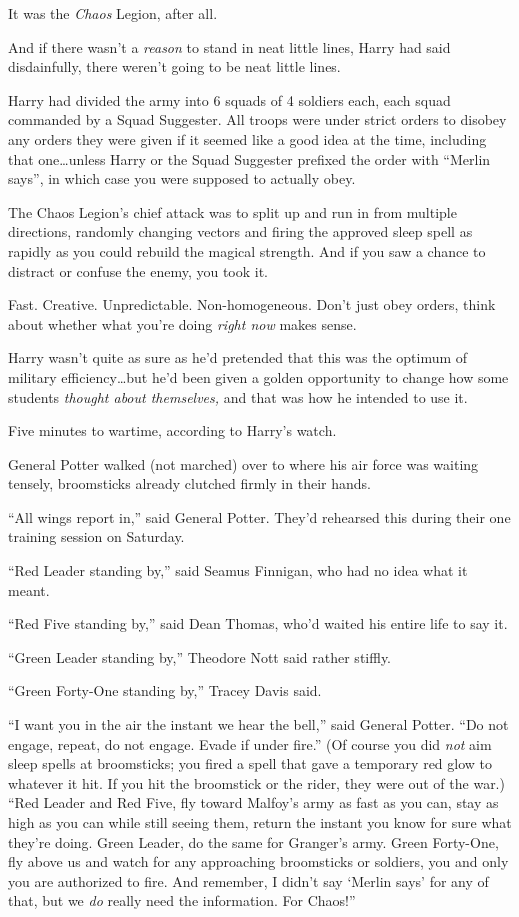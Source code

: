 It was the \emph{Chaos} Legion, after all.

And if there wasn’t a \emph{reason} to stand in neat little lines, Harry had said disdainfully, there weren’t going to be neat little lines.

Harry had divided the army into 6 squads of 4 soldiers each, each squad commanded by a Squad Suggester. All troops were under strict orders to disobey any orders they were given if it seemed like a good idea at the time, including that one…unless Harry or the Squad Suggester prefixed the order with “Merlin says”, in which case you were supposed to actually obey.

The Chaos Legion’s chief attack was to split up and run in from multiple directions, randomly changing vectors and firing the approved sleep spell as rapidly as you could rebuild the magical strength. And if you saw a chance to distract or confuse the enemy, you took it.

Fast. Creative. Unpredictable. Non-homogeneous. Don’t just obey orders, think about whether what you’re doing \emph{right now} makes sense.

Harry wasn’t quite as sure as he’d pretended that this was the optimum of military efficiency…but he’d been given a golden opportunity to change how some students \emph{thought about themselves,} and that was how he intended to use it.

Five minutes to wartime, according to Harry’s watch.

General Potter walked (not marched) over to where his air force was waiting tensely, broomsticks already clutched firmly in their hands.

“All wings report in,” said General Potter. They’d rehearsed this during their one training session on Saturday.

“Red Leader standing by,” said Seamus Finnigan, who had no idea what it meant.

“Red Five standing by,” said Dean Thomas, who’d waited his entire life to say it.

“Green Leader standing by,” Theodore Nott said rather stiffly.

“Green Forty-One standing by,” Tracey Davis said.

“I want you in the air the instant we hear the bell,” said General Potter. “Do not engage, repeat, do not engage. Evade if under fire.” (Of course you did \emph{not} aim sleep spells at broomsticks; you fired a spell that gave a temporary red glow to whatever it hit. If you hit the broomstick or the rider, they were out of the war.) “Red Leader and Red Five, fly toward Malfoy’s army as fast as you can, stay as high as you can while still seeing them, return the instant you know for sure what they’re doing. Green Leader, do the same for Granger’s army. Green Forty-One, fly above us and watch for any approaching broomsticks or soldiers, you and only you are authorized to fire. And remember, I didn’t say ‘Merlin says’ for any of that, but we \emph{do} really need the information. For Chaos!”

